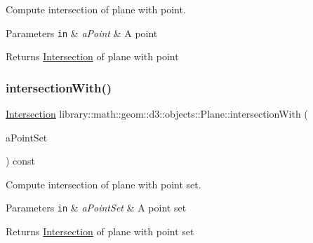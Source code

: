 Compute intersection of plane with point. 


\begin{DoxyParams}[1]{Parameters}
\mbox{\tt in}  & {\em a\+Point} & A point \\
\hline
\end{DoxyParams}
\begin{DoxyReturn}{Returns}
\hyperlink{classlibrary_1_1math_1_1geom_1_1d3_1_1_intersection}{Intersection} of plane with point 
\end{DoxyReturn}
\mbox{\label{classlibrary_1_1math_1_1geom_1_1d3_1_1objects_1_1_plane_ad4c2d677fbae29b9a9261a3cd3bcbdba}} 
\subsubsection{\texorpdfstring{intersection\+With()}{intersectionWith()}\hspace{0.1cm}{\footnotesize\ttfamily [2/5]}}
{\footnotesize\ttfamily \hyperlink{classlibrary_1_1math_1_1geom_1_1d3_1_1_intersection}{Intersection} library\+::math\+::geom\+::d3\+::objects\+::\+Plane\+::intersection\+With (\begin{DoxyParamCaption}\item[{const \hyperlink{classlibrary_1_1math_1_1geom_1_1d3_1_1objects_1_1_point_set}{Point\+Set} \&}]{a\+Point\+Set }\end{DoxyParamCaption}) const}



Compute intersection of plane with point set. 


\begin{DoxyParams}[1]{Parameters}
\mbox{\tt in}  & {\em a\+Point\+Set} & A point set \\
\hline
\end{DoxyParams}
\begin{DoxyReturn}{Returns}
\hyperlink{classlibrary_1_1math_1_1geom_1_1d3_1_1_intersection}{Intersection} of plane with point set 
\end{DoxyReturn}
\mbox{\label{classlibrary_1_1math_1_1geom_1_1d3_1_1objects_1_1_plane_a4e6f9004893979945ea2e1c592eb5258}} 
